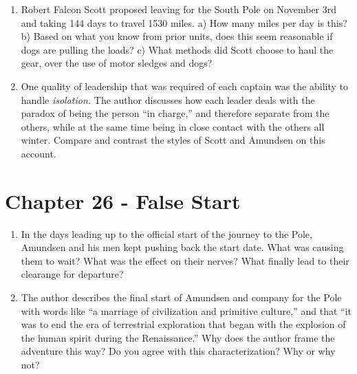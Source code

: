 \documentclass{article}
\begin{document}
\begin{enumerate}
\item Robert Falcon Scott proposed leaving for the South Pole on November 3rd and taking 144 days to travel 1530 miles.  a) How many miles per day is this?  b) Based on what you know from prior units, does this seem reasonable if dogs are pulling the loads?  c) What methods did Scott choose to haul the gear, over the use of motor sledges and dogs? \\ \vspace{2cm}
\item One quality of leadership that was required of each captain was the ability to handle \textit{isolation.}  The author discusses how each leader deals with the paradox of being the person ``in charge,'' and therefore separate from the others, while at the same time being in close contact with the others all winter.  Compare and contrast the styles of Scott and Amundsen on this account.  \\ \vspace{2cm}
\end{enumerate}

\section{Chapter 26 - False Start}
\begin{enumerate}
\item In the days leading up to the official start of the journey to the Pole, Amundsen and his men kept pushing back the start date.  What was causing them to wait?  What was the effect on their nerves?  What finally lead to their clearange for departure? \\ \vspace{2cm}
\item The author describes the final start of Amundsen and company for the Pole with words like ``a marriage of civilization and primitive culture,'' and that ``it was to end the era of terrestrial exploration that began with the explosion of the human spirit during the Renaissance.''  Why does the author frame the adventure this way?  Do you agree with this characterization?  Why or why not?  \\ \vspace{2cm}
\end{enumerate}
\end{document}
